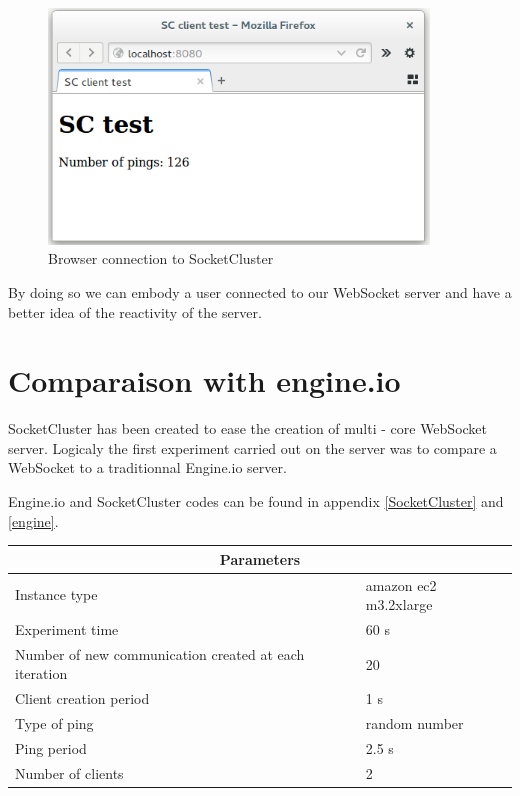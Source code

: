 \begin{figure}[H]
	\centering
		\includegraphics[width=0.9\textwidth]{./Figures/browser.png}
	\caption[Browser connection to SocketCluster]{Browser connection to SocketCluster}
	\label{fig:browser}
\end{figure}

By doing so we can embody a user connected to our WebSocket server and have a
better idea of the reactivity of the server.


\section{Comparaison with engine.io}

SocketCluster has been created to ease the creation of multi - core WebSocket
server. Logicaly the first experiment carried out on the server was to compare
a WebSocket to a traditionnal Engine.io server. 

Engine.io and SocketCluster codes can be found in appendix \ref{SocketCluster} and \ref{engine}. 

\begin{center}
  \begin{tabular}{ | l | l |}
  \hline
  \multicolumn{2}{|c|}{Parameters} \\
  \hline
    Instance type &  amazon ec2 m3.2xlarge\\ 
    Experiment time & 60 s \\
    Number of new communication created at each iteration & 20 \\
    Client creation period & 1 s \\
    Type of ping & random number \\ 
    Ping period & 2.5 s \\ 
    Number of clients & 2 \\
  \hline
  \end{tabular}
\end{center}


